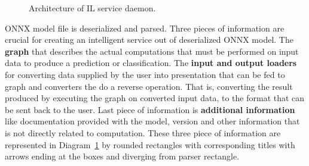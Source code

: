 \documentclass[english, 12pt, a4paper, elec, utf8, online]{aaltothesis}
\begin{document}
\usetikzlibrary{shapes.misc} 
\begin{figure}[h!]
\centering
{}

\caption{Architecture of IL service daemon.}\label{fig:il_architecture}
\end{figure}

ONNX model file is deserialized and parsed. Three pieces of information are crucial for creating an intelligent service out of deserialized ONNX model. The \textbf{graph} that describes the actual computations that must be performed on input data to produce a prediction or classification. The \textbf{input and output loaders} for converting data supplied by the user into presentation that can be fed to graph and converters the do a reverse operation. That is, converting the result produced by executing the graph on converted input data, to the format that can be sent back to the user. Last piece of information is \textbf{additional information} like documentation provided with the model, version and other information that is not directly related to computation. These three piece of information are represented in Diagram~\ref{fig:il_architecture} by rounded rectangles with corresponding titles with arrows ending at the boxes and diverging from parser rectangle. 
\end{document}
